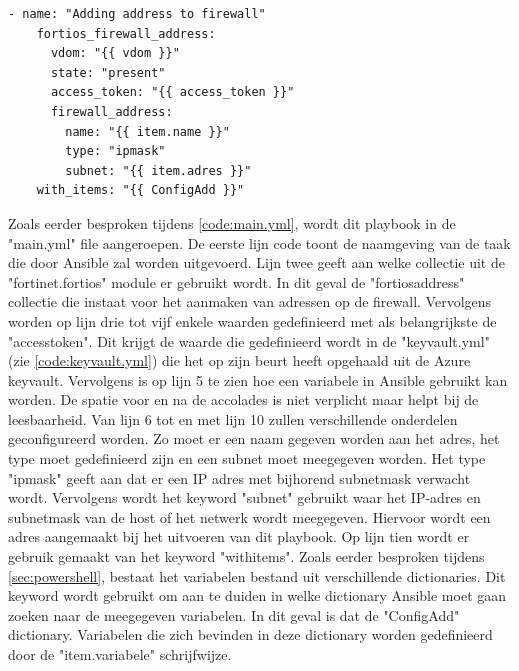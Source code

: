 \begin{lstlisting}[caption={Playbook addresses}, label={lst:CodeAddress}]
  - name: "Adding address to firewall"
    fortios_firewall_address:
      vdom: "{{ vdom }}" 
      state: "present"
      access_token: "{{ access_token }}"
      firewall_address:
        name: "{{ item.name }}"
        type: "ipmask"
        subnet: "{{ item.adres }}" 
    with_items: "{{ ConfigAdd }}"

\end{lstlisting}
Zoals eerder besproken tijdens \ref{code:main.yml}, wordt dit playbook in de "main.yml" file  aangeroepen. De eerste lijn code toont de naamgeving van de taak die door Ansible zal worden uitgevoerd. Lijn twee geeft aan welke collectie uit de "fortinet.fortios" module er gebruikt wordt. In dit geval de "fortios\textunderscore address" collectie die instaat voor het aanmaken van adressen op de firewall. Vervolgens worden op lijn drie tot vijf enkele waarden gedefinieerd met als belangrijkste de "access\textunderscore token". Dit krijgt de waarde die gedefinieerd wordt in de "keyvault.yml" (zie \ref{code:keyvault.yml}) die het op zijn beurt heeft opgehaald uit de Azure keyvault. Vervolgens is op lijn 5 te zien hoe een variabele in Ansible gebruikt kan worden. De spatie voor en na de accolades is niet verplicht maar helpt bij de leesbaarheid. Van lijn 6 tot en met lijn 10 zullen verschillende onderdelen geconfigureerd worden. Zo moet er een naam gegeven worden aan het adres, het type moet gedefinieerd zijn en een subnet moet meegegeven worden. Het type "ipmask" geeft aan dat er een IP adres met bijhorend subnetmask verwacht wordt. Vervolgens wordt het keyword "subnet" gebruikt waar het IP-adres en subnetmask van de host of het netwerk wordt meegegeven. Hiervoor wordt een adres aangemaakt bij het uitvoeren van dit playbook. Op lijn tien wordt er gebruik gemaakt van het keyword "with\textunderscore items". Zoals eerder besproken tijdens \ref{sec:powershell}, bestaat het variabelen bestand uit verschillende dictionaries. Dit keyword wordt gebruikt om aan te duiden in welke dictionary Ansible moet gaan zoeken naar de meegegeven variabelen. In dit geval is dat de "ConfigAdd" dictionary. Variabelen die zich bevinden in deze dictionary worden gedefinieerd door de "item.variabele" schrijfwijze. 
